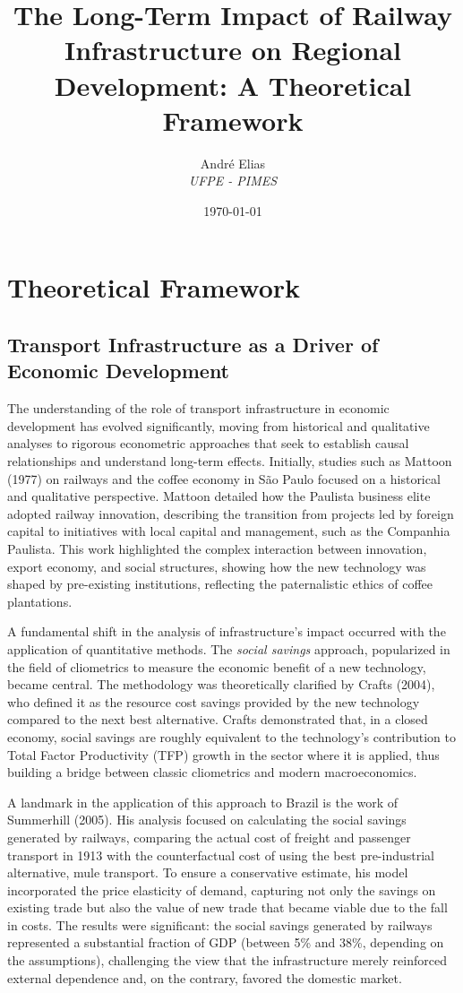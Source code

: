 \documentclass[12pt, a4paper]{article}
\title{The Long-Term Impact of Railway Infrastructure on Regional Development: A Theoretical Framework}
\author{André Elias \\ \textit{UFPE - PIMES}}
\date{\today}
\begin{document}
\maketitle

\section{Theoretical Framework}

\subsection{Transport Infrastructure as a Driver of Economic Development}

The understanding of the role of transport infrastructure in economic development has evolved significantly, moving from historical and qualitative analyses to rigorous econometric approaches that seek to establish causal relationships and understand long-term effects. Initially, studies such as Mattoon (1977) on railways and the coffee economy in S\~{a}o Paulo focused on a historical and qualitative perspective. Mattoon detailed how the Paulista business elite adopted railway innovation, describing the transition from projects led by foreign capital to initiatives with local capital and management, such as the Companhia Paulista. This work highlighted the complex interaction between innovation, export economy, and social structures, showing how the new technology was shaped by pre-existing institutions, reflecting the paternalistic ethics of coffee plantations.

A fundamental shift in the analysis of infrastructure's impact occurred with the application of quantitative methods. The \textit{social savings} approach, popularized in the field of cliometrics to measure the economic benefit of a new technology, became central. The methodology was theoretically clarified by Crafts (2004), who defined it as the resource cost savings provided by the new technology compared to the next best alternative. Crafts demonstrated that, in a closed economy, social savings are roughly equivalent to the technology's contribution to Total Factor Productivity (TFP) growth in the sector where it is applied, thus building a bridge between classic cliometrics and modern macroeconomics.

A landmark in the application of this approach to Brazil is the work of Summerhill (2005). His analysis focused on calculating the social savings generated by railways, comparing the actual cost of freight and passenger transport in 1913 with the counterfactual cost of using the best pre-industrial alternative, mule transport. To ensure a conservative estimate, his model incorporated the price elasticity of demand, capturing not only the savings on existing trade but also the value of new trade that became viable due to the fall in costs. The results were significant: the social savings generated by railways represented a substantial fraction of GDP (between 5\% and 38\%, depending on the assumptions), challenging the view that the infrastructure merely reinforced external dependence and, on the contrary, favored the domestic market.
\end{document}
